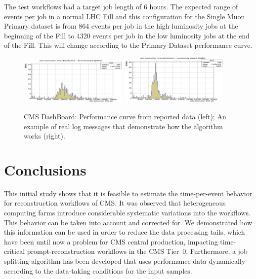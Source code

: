 \documentclass[a4paper]{jpconf}
\begin{document}
The test workflows had a target job length of 6 hours. The expected range of events per job in a normal LHC Fill and this configuration for the Single Muon Primary dataset is from 864 events per job in the high luminosity jobs at the beginning of the Fill to 4320 events per job in the low luminosity jobs at the end of the Fill. This will change according to the Primary Dataset performance curve.

\begin{figure}[ht]
  \begin{center}
\includegraphics[width=0.47\textwidth,height=0.47\textwidth]{17.pdf}
\includegraphics[width=0.47\textwidth,height=0.47\textwidth]{18.pdf}
\caption{\label{fig6} CMS DashBoard: Performance curve from reported data (left); An example of real log messages that demonstrate how the algorithm works (right).}
  \end{center}
\vspace{-8mm}
\end{figure}


\section{Conclusions}

This initial study shows that it is feasible to estimate the time-per-event behavior for reconstruction workflows of CMS. It was observed that heterogeneous computing farms introduce considerable systematic variations into the workflows. This behavior can be taken into account and corrected for. We demonstrated how this information can be used in order to reduce the data processing tails, which have been until now a problem for CMS central production, impacting time-critical prompt-reconstruction workflows in the CMS Tier~0. Furthermore, a job splitting algorithm has been developed that uses performance data dynamically according to the data-taking conditions for the input samples.
\end{document}
